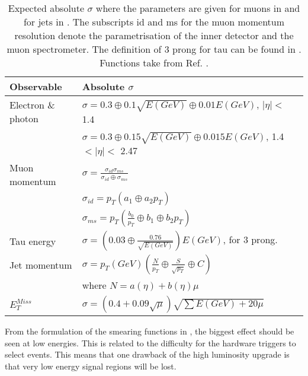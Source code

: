 \newpage
\begin{table}[H]
\renewcommand{\arraystretch}{1.5} %
\begin{center}
\begin{tabular}{|l|l|}
\hline
Observable & Absolute $\sigma$ \\ \hline
Electron \& photon & $\sigma=0.3\oplus 0.1\sqrt{E(GeV)}\oplus 0.01E(GeV)$, $|\eta|<$ 1.4 \\
& $\sigma=0.3\oplus 0.15\sqrt{E(GeV)}\oplus 0.015E(GeV)$, 1.4 $<|\eta|<$ 2.47 \\ \hline 
Muon momentum& $\sigma=\frac{\sigma_{id} \sigma_{ms}}{\sigma_{id} \oplus \sigma_{ms}}$\\
& $\sigma_{id}=p_T(a_1 \oplus a_2 p_T)$\\
& $\sigma_{ms}=p_T(\frac{b_0}{p_T} \oplus b_1 \oplus b_2 p_T)$\\ \hline
Tau energy& $\sigma =(0.03\oplus \frac{0.76}{\sqrt{E(GeV)}})E(GeV)$, for 3 prong.\\ \hline
Jet momentum& $\sigma = p_T(GeV)(\frac{N}{p_T} \oplus \frac{S}{\sqrt{p_T}} \oplus C)$ \\ 
& where $N=a(\eta)+b(\eta)\mu$ \\ \hline
$E_T^{Miss}$ & $\sigma = (0.4+0.09\sqrt{\mu})\sqrt{\sum E(GeV)+20\mu}$ \\ \hline
\end{tabular}
\end{center}
\renewcommand{\arraystretch}{1.0} %
\caption{Expected absolute $\sigma$ where the parameters are given for muons in  and for jets in . The subscripts id and ms for the muon momentum resolution denote the parametrisation of the inner detector and the muon spectrometer. The definition of 3 prong for tau can be found in . Functions take from Ref. \citep{ATL-PHYS-PUB-2013-004}.}
\label{tab:expected sigma}
\end{table}

From the formulation of the smearing functions in , the biggest effect should be seen at low energies. This is related to the difficulty for the hardware triggers to select events. This means that one drawback of the high luminosity upgrade is that very low energy signal regions will be lost.

